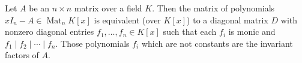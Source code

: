 Let $A$ be an $n \times n$ matrix over a field $K$. Then the matrix of polynomials $xI_n - A \in \operatorname{Mat}_n K[x]$ is equivalent (over $K[x]$) to a diagonal matrix $D$ with nonzero diagonal entries $f_1, \ldots, f_n \in K[x]$ such that each $f_i$ is monic and $f_1 \mid f_2 \mid \cdots \mid f_n$. Those polynomials $f_i$ which are not constants are the invariant factors of $A$.
